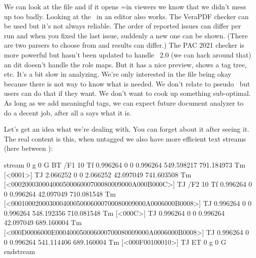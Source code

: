 \startitemize
\startitem
    We can look at the file and if it opens =in viewers we know that we didn't
    mess up too badly. Looking at the \PDF\ in an editor also works.
\stopitem
\startitem
    The VeraPDF checker can be used but it's not always reliable. The order of
    reported issues can differ per run and when you fixed the last issue,
    suddenly a new one can be shown. (There are two parsers to choose from and
    results can differ.)
\stopitem
\startitem
    The PAC 2021 checker is more powerful but hasn't been updated to handle \PDF\
    2.0 (we can hack around that) an dit doesn't handle the role maps. But it has
    a nice preview, shows a tag tree, etc. It's a bit slow in analyzing.
\stopitem
\startitem
    We're only interested in the file being okay because there is not way to know
    what is needed. We don't relate to pseudo \HTML\ but users can do that if
    they want. We don't want to cook up something sub-optimal.
\stopitem
\startitem
    As long as we add meaningful tags, we can expect future document analyzer to do
    a decent job, after all a \quote {section} says what it is.
\stopitem
\stopitemize

\stoptitle

\starttitle[title={Structure, meaning and rolemaps (1)}]

\startlinecorrection
\stoplinecorrection

\stoptitle


\starttitle[title={Structure, meaning and rolemaps (2)}]

\startlinecorrection
\stoplinecorrection

\stoptitle

\starttitle[title={Structure, meaning and rolemaps (3)}]

Let's get an idea what we're dealing with. You can forget about it after seeing
it. The real content is this, when untagged we also have more efficient text
streams (here between \type {<>}):

\starttyping[style=\ttxx\setupinterlinespace]
stream
0 g 0 G
BT
/F1 10 Tf
0.996264 0 0 0.996264 549.598217 791.184973 Tm [<0001>] TJ
2.066252 0 0 2.066252 42.097049 741.603508 Tm [<00020003000400050006000700080009000A000B000C>] TJ
/F2 10 Tf
0.996264 0 0 0.996264 42.097049 710.081548 Tm [<000100020003000400050006000700080009000A0006000B0008>] TJ
0.996264 0 0 0.996264 548.192356 710.081548 Tm [<000C>] TJ
0.996264 0 0 0.996264 42.097049 689.160004 Tm [<000D0006000E000400050006000700080009000A0006000B0008>] TJ
0.996264 0 0 0.996264 541.114406 689.160004 Tm [<000F00100010>] TJ
ET
0 g 0 G
endstream
\stoptyping


